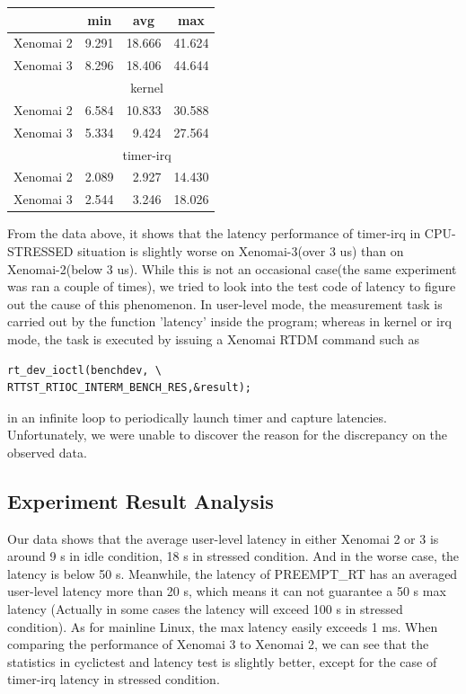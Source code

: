 \documentclass[10pt,a4paper]{article}
\begin{document}
\begin{multicols}{2}
{\begin{tabular}{|l|c|r|r|}
 & min & \multicolumn{1}{c|}{avg} & \multicolumn{1}{c|}{max} \\ \hline
Xenomai 2 & 9.291 & 18.666 & 41.624 \\ \hline
Xenomai 3 & 8.296 & 18.406 & 44.644 \\ \hline
& \multicolumn{3}{c|}{kernel}       \\ \hline
Xenomai 2 & 6.584 & 10.833 & 30.588 \\ \hline
Xenomai 3 & 5.334 & 9.424 & 27.564  \\ \hline
& \multicolumn{3}{c|}{timer-irq}    \\ \hline
Xenomai 2 & 2.089 & 2.927 & 14.430  \\ \hline
Xenomai 3 & 2.544 & 3.246 & 18.026  \\ \hline
\end{tabular}
}

From the data above, it shows that the latency performance of timer-irq in CPU-STRESSED situation is slightly worse on Xenomai-3(over 3 us) than on Xenomai-2(below 3 us). While this is not an occasional case(the same experiment was ran a couple of times), we tried to look into the test code of latency to figure out the cause of this phenomenon. In user-level mode, the measurement task is carried out by the function 'latency' inside the program; whereas in kernel or irq mode, the task is executed by issuing a Xenomai RTDM command such as 
\begin{verbatim}
rt_dev_ioctl(benchdev, \
RTTST_RTIOC_INTERM_BENCH_RES,&result); 
\end{verbatim} 
in an infinite loop to periodically launch timer and capture latencies. Unfortunately, we were unable to discover the reason for the discrepancy on the observed data.
\subsection{Experiment Result Analysis}
Our data shows that the average user-level latency in either Xenomai 2 or 3 is around 9 \textmu s in idle condition, 18 \textmu s in stressed condition. And in the worse case, the latency is below 50 \textmu s. Meanwhile, the latency of PREEMPT\_RT has an averaged user-level latency more than 20 \textmu s, which means it can not guarantee a 50 \textmu s max latency (Actually in some cases the latency will exceed 100 \textmu s in stressed condition).  As for mainline Linux, the max latency easily exceeds 1 ms. When comparing the performance of Xenomai 3 to Xenomai 2, we can see that the statistics in cyclictest and latency test is slightly better, except for the case of timer-irq latency in stressed condition.


\end{multicols}
\end{document}
